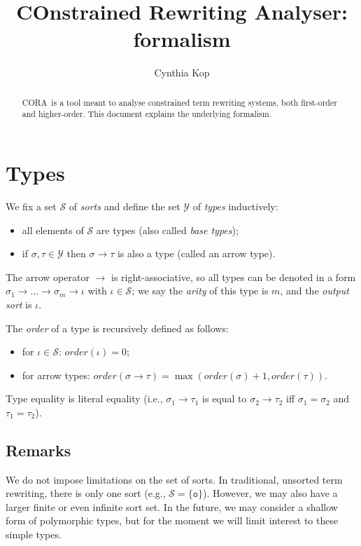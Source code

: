 \documentclass{lmcs}
\theoremstyle{theorem}\newtheorem{theorem}{Theorem}
\theoremstyle{theorem}\newtheorem{lemma}[theorem]{Lemma}
\theoremstyle{theorem}\newtheorem{corollary}[theorem]{Corollary}
\theoremstyle{definition}\newtheorem{definition}[theorem]{Definition}
\theoremstyle{definition}\newtheorem{example}[theorem]{Example}
\newcommand{\Sorts}{\mathcal{S}}
\newcommand{\Types}{\mathcal{Y}}
\newcommand{\order}{\mathit{order}}
\newcommand{\asort}{\iota}
\newcommand{\atype}{\sigma}
\newcommand{\btype}{\tau}
\newcommand{\arrtype}{\rightarrow}
\newcommand{\unitsort}{\mathtt{o}}
\newcommand{\cora}{\textsf{CORA}\xspace}
\begin{document}
\title{COnstrained Rewriting Analyser: formalism}
\author{Cynthia Kop}
\address{Department of Software Science, Radboud University Nijmegen}

\maketitle

\begin{abstract}
\cora\ is a tool meant to analyse constrained term rewriting systems, both
first-order and higher-order.  This document explains the underlying formalism.
\end{abstract}

\section{Types}

We fix a set $\Sorts$ of \emph{sorts} and define the set $\Types$ of \emph{types} inductively:
\begin{itemize}
\item all elements of $\Sorts$ are types (also called \emph{base types});
\item if $\atype,\btype \in \Types$ then $\atype \arrtype \btype$ is also a type (called an arrow
  type).
\end{itemize}
The arrow operator $\arrtype$ is right-associative, so all types can be denoted in a form
$\atype_1 \arrtype \dots \arrtype \atype_m \arrtype \asort$ with $\asort \in \Sorts$; we say the
\emph{arity} of this type is $m$, and the \emph{output sort} is $\asort$.

The \emph{order} of a type is recursively defined as follows:
\begin{itemize}
\item for $\asort \in \Sorts$: $\order(\asort) = 0$;
\item for arrow types: $\order(\atype \arrtype \btype) = \max(\order(\atype) + 1,\order(\btype))$.
\end{itemize}

\bigskip
Type equality is literal equality (i.e., $\atype_1 \arrtype \btype_1$ is equal to $\atype_2 \arrtype
\btype_2$ iff $\atype_1 = \atype_2$ and $\btype_1 = \btype_2$).

\subsection*{Remarks}

We do not impose limitations on the set of sorts.  In traditional, unsorted term rewriting, there
is only one sort (e.g., $\Sorts = \{ \unitsort \}$). However, we may also have a larger finite or
even infinite sort set.
In the future, we may consider a shallow form of polymorphic types, but for the moment we will limit
interest to these simple types.
\end{document}
